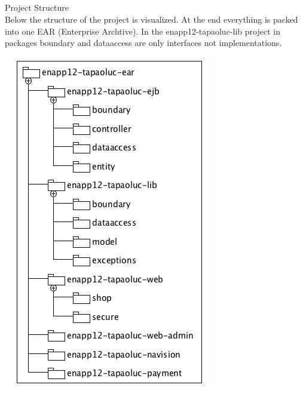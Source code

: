 \documentclass[11pt]{amsart}
\begin{document}
\subsection{}Project Structure \\
Below the structure of the project is visualized. At the end everything is packed into one EAR (Enterprise Archtive). In the \textsf{enapp12-tapaoluc-lib} project in packages boundary and dataaccess are only interfaces not implementations.\\
\includegraphics[scale=0.7]{project-structure.png}
\end{document}
